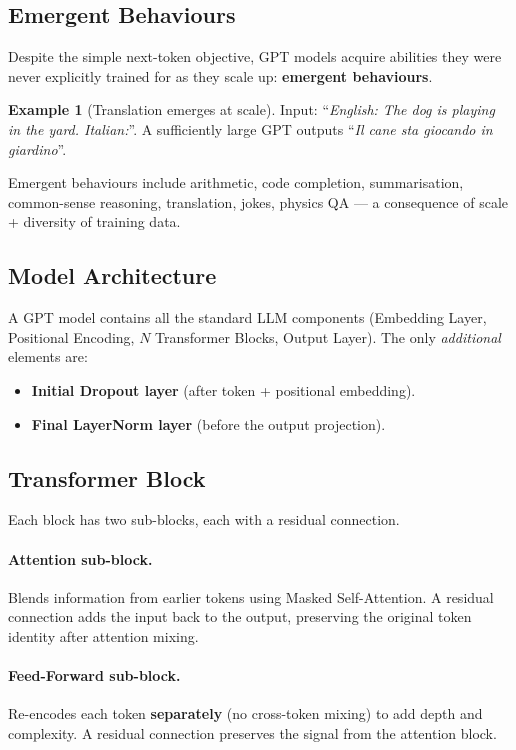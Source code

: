 \documentclass[11pt,a4paper]{article}
\theoremstyle{definition}
\newtheorem{example}{Example}[section]
\theoremstyle{plain}
\theoremstyle{remark}
\begin{document}
\subsection{Emergent Behaviours}

Despite the simple next-token objective, GPT models acquire abilities they were never explicitly trained for as they scale up: \textbf{emergent behaviours}.

\begin{example}[Translation emerges at scale]
Input: ``\emph{English: The dog is playing in the yard. Italian:}''. A sufficiently large GPT outputs ``\emph{Il cane sta giocando in giardino}''.
\end{example}

Emergent behaviours include arithmetic, code completion, summarisation, common-sense reasoning, translation, jokes, physics QA --- a consequence of scale + diversity of training data.

\subsection{Model Architecture}

A GPT model contains all the standard LLM components (Embedding Layer, Positional Encoding, $N$ Transformer Blocks, Output Layer). The only \emph{additional} elements are:
\begin{itemize}
    \item \textbf{Initial Dropout layer} (after token + positional embedding).
    \item \textbf{Final LayerNorm layer} (before the output projection).
\end{itemize}

\subsection{Transformer Block}

Each block has two sub-blocks, each with a residual connection.

\paragraph{Attention sub-block.} Blends information from earlier tokens using Masked Self-Attention. A residual connection adds the input back to the output, preserving the original token identity after attention mixing.

\paragraph{Feed-Forward sub-block.} Re-encodes each token \textbf{separately} (no cross-token mixing) to add depth and complexity. A residual connection preserves the signal from the attention block.
\end{document}
